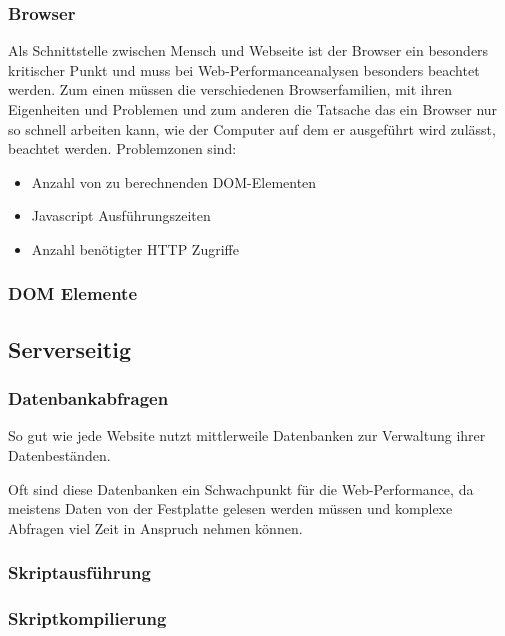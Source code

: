 \subsubsection{Browser}
Als Schnittstelle zwischen Mensch und Webseite ist der Browser ein besonders kritischer Punkt und muss bei Web-Performanceanalysen besonders beachtet werden. Zum einen müssen die verschiedenen Browserfamilien, mit ihren Eigenheiten und Problemen und zum anderen die Tatsache das ein Browser nur so schnell arbeiten kann, wie der Computer auf dem er ausgeführt wird zulässt, beachtet werden. 
Problemzonen sind:
\begin{itemize}
  \item Anzahl von zu berechnenden DOM-Elementen %
  \item Javascript Ausführungszeiten
  \item Anzahl benötigter HTTP Zugriffe %
\end{itemize}

\subsubsection{DOM Elemente}
\subsection{Serverseitig}


\subsubsection{Datenbankabfragen}
So gut wie jede Website nutzt mittlerweile Datenbanken zur Verwaltung ihrer Datenbeständen.

Oft sind diese Datenbanken ein Schwachpunkt für die Web-Performance, da meistens Daten von der Festplatte gelesen werden müssen und komplexe Abfragen viel Zeit in Anspruch nehmen können.

\subsubsection{Skriptausführung}
\subsubsection{Skriptkompilierung}

